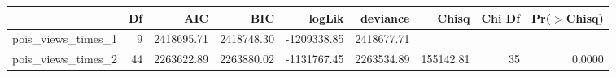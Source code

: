 \begin{table}[ht]
\centering
\begin{tabular}{lrrrrrrrr}
  \hline
 & Df & AIC & BIC & logLik & deviance & Chisq & Chi Df & Pr($>$Chisq) \\ 
  \hline
pois\_views\_times\_1 & 9 & 2418695.71 & 2418748.30 & -1209338.85 & 2418677.71 &  &  &  \\ 
  pois\_views\_times\_2 & 44 & 2263622.89 & 2263880.02 & -1131767.45 & 2263534.89 & 155142.81 & 35 & 0.0000 \\ 
   \hline
\end{tabular}
\end{table}
